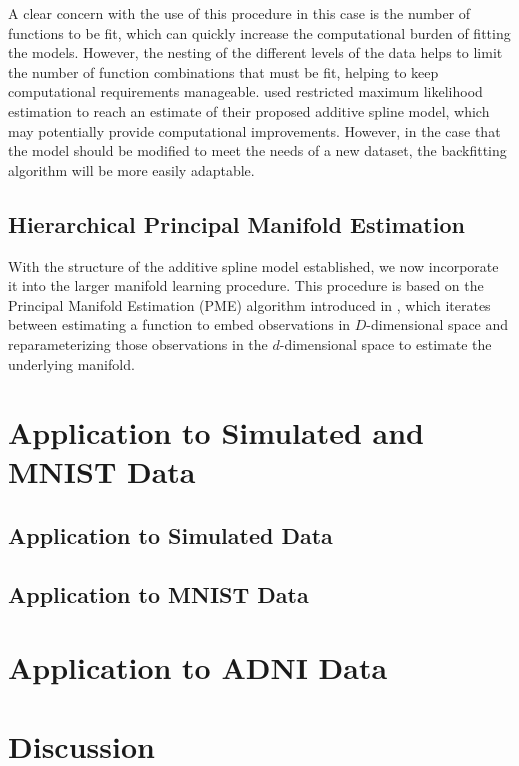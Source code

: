 \documentclass[11pt,reqno]{article}
\theoremstyle{definition}
\begin{document}
A clear concern with the use of this procedure in this case is the number of functions to be fit, which can quickly increase the computational burden of fitting the models. However, the nesting of the different levels of the data helps to limit the number of function combinations that must be fit, helping to keep computational requirements manageable. \cite{brumbackSmoothingSplineModels1998} used restricted maximum likelihood estimation to reach an estimate of their proposed additive spline model, which may potentially provide computational improvements. However, in the case that the model should be modified to meet the needs of a new dataset, the backfitting algorithm will be more easily adaptable. 

\subsection{Hierarchical Principal Manifold Estimation}

With the structure of the additive spline model established, we now incorporate it into the larger manifold learning procedure. This procedure is based on the Principal Manifold Estimation (PME) algorithm introduced in \cite{mengPrincipalManifoldEstimation2021}, which iterates between estimating a function to embed observations in $D$-dimensional space and reparameterizing those observations in the $d$-dimensional space to estimate the underlying manifold.

\section{Application to Simulated and MNIST Data}

\subsection{Application to Simulated Data}

\subsection{Application to MNIST Data}

\section{Application to ADNI Data}

\section{Discussion}

\newpage

\nocite{*}
%
%
\printbibliography
\end{document}
